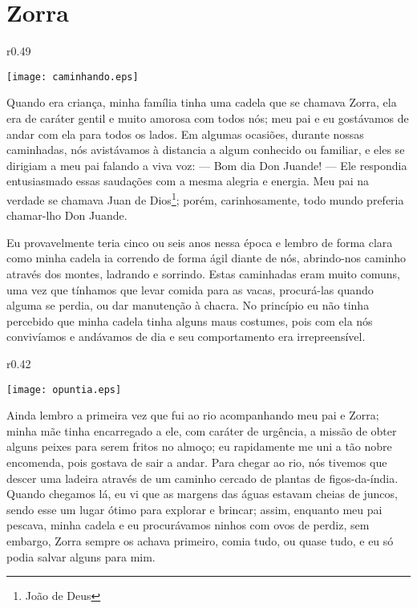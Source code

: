 \cleardoublepage
\newpage
{}
\chapter{Zorra}


\begin{wrapfigure}{r}{0.49\textwidth}
  \begin{center}
  \vspace{-30pt}
    \texttt{[image: caminhando.eps]}
  \end{center}
  \vspace{-20pt}
\end{wrapfigure}
Quando era criança, minha família tinha uma cadela que se chamava Zorra, ela era de caráter gentil e muito amorosa com todos nós; meu pai e eu gostávamos de andar com ela para todos os lados. Em algumas ocasiões, durante nossas caminhadas, nós avistávamos à distancia a algum conhecido ou familiar, e eles se dirigiam a meu pai falando a viva voz: 
--- Bom dia Don Juande! --- 
Ele respondia entusiasmado essas saudações com a mesma alegria e energia.
Meu pai na verdade se chamava Juan de Dios\footnote{João de Deus}; porém, carinhosamente, todo mundo preferia chamar-lho Don Juande.


Eu provavelmente teria cinco ou seis anos nessa época e lembro de forma clara como minha cadela ia correndo de forma ágil diante de nós, abrindo-nos caminho através dos montes, ladrando e sorrindo.
Estas caminhadas eram muito comuns, uma vez que tínhamos que levar comida para as vacas, procurá-las quando alguma se perdia, ou dar manutenção à chacra.
No princípio eu não tinha percebido que minha cadela tinha alguns maus costumes, pois com ela nós convivíamos e andávamos de dia e seu comportamento era irrepreensível. 

\begin{wrapfigure}{r}{0.42\textwidth}
  \begin{center}
  \vspace{-30pt}
    \texttt{[image: opuntia.eps]}
  \end{center}
  \vspace{-20pt}
\end{wrapfigure}
Ainda lembro a primeira vez que fui ao rio acompanhando meu pai e Zorra; minha mãe tinha encarregado a ele, com caráter de urgência, a missão de obter alguns peixes para serem fritos no almoço; eu rapidamente me uni a tão nobre encomenda, pois gostava de sair a andar. 
Para chegar ao rio, nós tivemos que descer uma ladeira através de um caminho cercado de plantas de figos-da-índia. Quando chegamos lá, eu vi que as margens das águas estavam cheias de juncos, sendo esse um lugar ótimo para explorar e brincar; assim, enquanto meu pai pescava, minha cadela e eu procurávamos ninhos com ovos de perdiz, sem embargo, Zorra sempre os achava primeiro, comia tudo, ou quase tudo, e eu só podia salvar alguns para mim.


